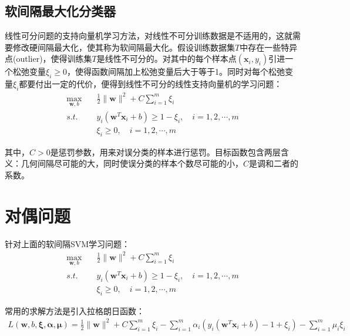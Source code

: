 \subsection{软间隔最大化分类器}
线性可分问题的支持向量机学习方法，对线性不可分训练数据是不适用的，这就需要修改硬间隔最大化，使其称为软间隔最大化。假设训练数据集$T$中存在一些特异点(outlier)，使得训练集$T$是线性不可分的。对其中的每个样本点$(\mathbf{x}_i,y_i)$引进一个松弛变量$\xi_i \ge 0$，使得函数间隔加上松弛变量后大于等于1。同时对每个松弛变量$\xi_i$都要付出一定的代价，便得到线性不可分的线性支持向量机的学习问题：
\begin{equation}
\begin{split} %
   \max_{\mathbf{w},b} \quad & \frac{1}{2}\|\mathbf{w}\|^2+C\sum^m_{i=1}\xi_i \\
   s.t. \quad & y_i(\mathbf{w}^T\mathbf{x}_i+b) \ge 1-\xi_i, \quad i=1,2,\cdots,m \\
   & \xi_i \ge 0, \quad  i=1,2,\cdots,m
\end{split}
\end{equation}

其中，$C > 0$是惩罚参数，用来对误分类的样本进行惩罚。目标函数包含两层含义：几何间隔尽可能的大，同时使误分类的样本个数尽可能的小，$C$是调和二者的系数。

\section{对偶问题}
针对上面的软间隔SVM学习问题：
\begin{equation*}
\begin{split} %
   \max_{\mathbf{w},b} \quad & \frac{1}{2}\|\mathbf{w}\|^2+C\sum^m_{i=1}\xi_i \\
   s.t. \quad & y_i(\mathbf{w}^T\mathbf{x}_i+b) \ge 1-\xi_i, \quad i=1,2,\cdots,m \\
   & \xi_i \ge 0, \quad  i=1,2,\cdots,m
\end{split}
\end{equation*}

常用的求解方法是引入拉格朗日函数：
\begin{align} %
   L(\mathbf{w},b,\mathbf{\xi},\mathbf{\alpha},\mathbf{\mu})=\frac{1}{2}\|\mathbf{w}\|^2+C\sum^{m}_{i=1}\xi_i-\sum^{m}_{i=1}\alpha_i(y_i(\mathbf{w}^T\mathbf{x}_i+b)-1+\xi_i)-\sum^m_{i=1}\mu_i\xi_i \label{equ:Lagrange}
\end{align}

